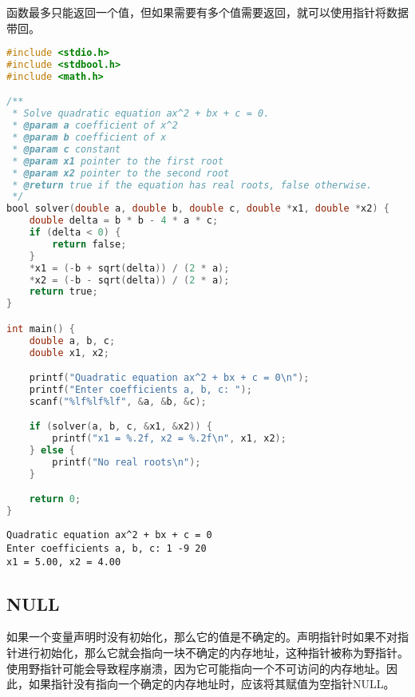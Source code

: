 函数最多只能返回一个值，但如果需要有多个值需要返回，就可以使用指针将数据带回。\\


\begin{lstlisting}[language=C]
#include <stdio.h>
#include <stdbool.h>
#include <math.h>

/**
 * Solve quadratic equation ax^2 + bx + c = 0.
 * @param a coefficient of x^2
 * @param b coefficient of x
 * @param c constant
 * @param x1 pointer to the first root
 * @param x2 pointer to the second root
 * @return true if the equation has real roots, false otherwise.
 */
bool solver(double a, double b, double c, double *x1, double *x2) {
    double delta = b * b - 4 * a * c;
    if (delta < 0) {
        return false;
    }
    *x1 = (-b + sqrt(delta)) / (2 * a);
    *x2 = (-b - sqrt(delta)) / (2 * a);
    return true;
}

int main() {
    double a, b, c;
    double x1, x2;

    printf("Quadratic equation ax^2 + bx + c = 0\n");
    printf("Enter coefficients a, b, c: ");
    scanf("%lf%lf%lf", &a, &b, &c);

    if (solver(a, b, c, &x1, &x2)) {
        printf("x1 = %.2f, x2 = %.2f\n", x1, x2);
    } else {
        printf("No real roots\n");
    }

    return 0;
}
\end{lstlisting}

\begin{tcolorbox}
    \begin{verbatim}
Quadratic equation ax^2 + bx + c = 0
Enter coefficients a, b, c: 1 -9 20
x1 = 5.00, x2 = 4.00
	\end{verbatim}
\end{tcolorbox}

\vspace{0.5cm}

\subsection{NULL}

如果一个变量声明时没有初始化，那么它的值是不确定的。声明指针时如果不对指针进行初始化，那么它就会指向一块不确定的内存地址，这种指针被称为野指针。\\

使用野指针可能会导致程序崩溃，因为它可能指向一个不可访问的内存地址。因此，如果指针没有指向一个确定的内存地址时，应该将其赋值为空指针NULL。

